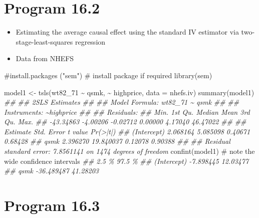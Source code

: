 \documentclass[
  10pt,
  a4paper,
]{book}
\newenvironment{Shaded}{\begin{snugshade}}{\end{snugshade}}
\newcommand{\AttributeTok}[1]{\textcolor[rgb]{0.40,0.45,0.13}{#1}}
\newcommand{\CommentTok}[1]{\textcolor[rgb]{0.37,0.37,0.37}{#1}}
\newcommand{\DocumentationTok}[1]{\textcolor[rgb]{0.37,0.37,0.37}{\textit{#1}}}
\newcommand{\FunctionTok}[1]{\textcolor[rgb]{0.28,0.35,0.67}{#1}}
\newcommand{\NormalTok}[1]{\textcolor[rgb]{0.00,0.46,0.62}{#1}}
\newcommand{\OtherTok}[1]{\textcolor[rgb]{0.00,0.46,0.62}{#1}}
\newcommand{\SpecialCharTok}[1]{\textcolor[rgb]{0.37,0.37,0.37}{#1}}
\providecommand{\tightlist}{%
  \setlength{\itemsep}{0pt}\setlength{\parskip}{0pt}}
\begin{document}
\section{Program 16.2}\label{program-16.2}

\begin{itemize}
\tightlist
\item
  Estimating the average causal effect using the standard IV estimator via two-stage-least-squares regression
\item
  Data from NHEFS
\end{itemize}

\begin{Shaded}
\begin{Highlighting}[]
\CommentTok{\#install.packages ("sem") \# install package if required}
\FunctionTok{library}\NormalTok{(sem) }

\NormalTok{model1 }\OtherTok{\textless{}{-}} \FunctionTok{tsls}\NormalTok{(wt82\_71 }\SpecialCharTok{\textasciitilde{}}\NormalTok{ qsmk, }\SpecialCharTok{\textasciitilde{}}\NormalTok{ highprice, }\AttributeTok{data =}\NormalTok{ nhefs.iv)}
\FunctionTok{summary}\NormalTok{(model1)}
\DocumentationTok{\#\# }
\DocumentationTok{\#\#  2SLS Estimates}
\DocumentationTok{\#\# }
\DocumentationTok{\#\# Model Formula: wt82\_71 \textasciitilde{} qsmk}
\DocumentationTok{\#\# }
\DocumentationTok{\#\# Instruments: \textasciitilde{}highprice}
\DocumentationTok{\#\# }
\DocumentationTok{\#\# Residuals:}
\DocumentationTok{\#\#      Min.   1st Qu.    Median      Mean   3rd Qu.      Max. }
\DocumentationTok{\#\# {-}43.34863  {-}4.00206  {-}0.02712   0.00000   4.17040  46.47022 }
\DocumentationTok{\#\# }
\DocumentationTok{\#\#              Estimate Std. Error t value Pr(\textgreater{}|t|)}
\DocumentationTok{\#\# (Intercept)  2.068164   5.085098 0.40671  0.68428}
\DocumentationTok{\#\# qsmk         2.396270  19.840037 0.12078  0.90388}
\DocumentationTok{\#\# }
\DocumentationTok{\#\# Residual standard error: 7.8561141 on 1474 degrees of freedom}
\FunctionTok{confint}\NormalTok{(model1)  }\CommentTok{\# note the wide confidence intervals}
\DocumentationTok{\#\#                  2.5 \%   97.5 \%}
\DocumentationTok{\#\# (Intercept)  {-}7.898445 12.03477}
\DocumentationTok{\#\# qsmk        {-}36.489487 41.28203}
\end{Highlighting}
\end{Shaded}

\section{Program 16.3}\label{program-16.3}
\end{document}
